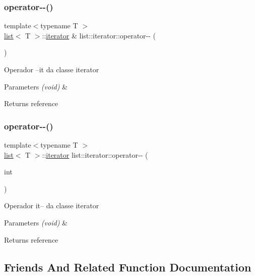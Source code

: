 \subsubsection{\texorpdfstring{operator-\/-\/()}{operator--()}\hspace{0.1cm}{\footnotesize\ttfamily [1/2]}}
{\footnotesize\ttfamily template$<$typename T $>$ \\
\mbox{\hyperlink{classsc_1_1list}{list}}$<$ T $>$\+::\mbox{\hyperlink{classsc_1_1list_1_1iterator}{iterator}} \& list\+::iterator\+::operator-\/-\/ (\begin{DoxyParamCaption}{ }\end{DoxyParamCaption})}

Operador --it da classe iterator 
\begin{DoxyParams}{Parameters}
{\em (void)} & \\
\hline
\end{DoxyParams}
\begin{DoxyReturn}{Returns}
reference 
\end{DoxyReturn}
\mbox{\label{classsc_1_1list_1_1iterator_ae0508132c274454f7199eb801a28f4e9}} 
\subsubsection{\texorpdfstring{operator-\/-\/()}{operator--()}\hspace{0.1cm}{\footnotesize\ttfamily [2/2]}}
{\footnotesize\ttfamily template$<$typename T $>$ \\
\mbox{\hyperlink{classsc_1_1list}{list}}$<$ T $>$\+::\mbox{\hyperlink{classsc_1_1list_1_1iterator}{iterator}} list\+::iterator\+::operator-\/-\/ (\begin{DoxyParamCaption}\item[{int}]{ }\end{DoxyParamCaption})}

Operador it-- da classe iterator 
\begin{DoxyParams}{Parameters}
{\em (void)} & \\
\hline
\end{DoxyParams}
\begin{DoxyReturn}{Returns}
reference 
\end{DoxyReturn}


\subsection{Friends And Related Function Documentation}
\mbox{\label{classsc_1_1list_1_1iterator_ab6cf03d50c50087700b0fb872accfa7b}} 
